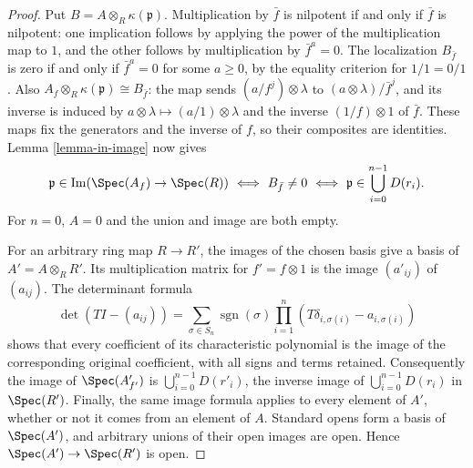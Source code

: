 \begin{proof}
\medskip\noindent
Put $B=A\otimes_R\kappa(\mathfrak p)$. Multiplication by $\bar f$
is nilpotent if and only if $\bar f$ is nilpotent: one implication
follows by applying the power of the multiplication map to $1$, and
the other follows by multiplication by $\bar f^a=0$.
The localization $B_{\bar f}$ is zero if and only if
$\bar f^a=0$ for some $a\geq0$, by the equality criterion for
$1/1=0/1$. Also
$A_f\otimes_R\kappa(\mathfrak p)\cong B_{\bar f}$:
the map sends $(a/f^j)\otimes\lambda$ to
$(a\otimes\lambda)/\bar f^j$, and its inverse is induced by
$a\otimes\lambda\mapsto(a/1)\otimes\lambda$ and the inverse
$(1/f)\otimes1$ of $\bar f$. These maps fix the generators and
the inverse of $f$, so their composites are identities.
Lemma \ref{lemma-in-image} now gives
$$
\mathfrak p\in\operatorname{Im}(\Spec(A_f)\to\Spec(R))
\ \Longleftrightarrow\ B_{\bar f}\ne0
\ \Longleftrightarrow\ \mathfrak p\in\bigcup_{i=0}^{n-1}D(r_i).
$$
For $n=0$, $A=0$ and the union and image are both empty.

\medskip\noindent
For an arbitrary ring map $R\to R'$, the images of the chosen basis
give a basis of $A'=A\otimes_RR'$. Its multiplication matrix for
$f'=f\otimes1$ is the image $(a'_{ij})$ of $(a_{ij})$. The determinant
formula
$$
\det(TI-(a_{ij}))=
\sum_{\sigma\in S_n}\operatorname{sgn}(\sigma)
\prod_{i=1}^n(T\delta_{i,\sigma(i)}-a_{i,\sigma(i)})
$$
shows that every coefficient of its characteristic polynomial is the
image of the corresponding original coefficient, with all signs and
terms retained. Consequently the image of $\Spec(A'_{f'})$ is
$\bigcup_{i=0}^{n-1}D(r'_i)$, the inverse image of
$\bigcup_{i=0}^{n-1}D(r_i)$ in $\Spec(R')$.
Finally, the same image formula applies to every element of $A'$,
whether or not it comes from an element of $A$. Standard opens form
a basis of $\Spec(A')$, and arbitrary unions of their open images
are open. Hence $\Spec(A')\to\Spec(R')$ is open.
\end{proof}